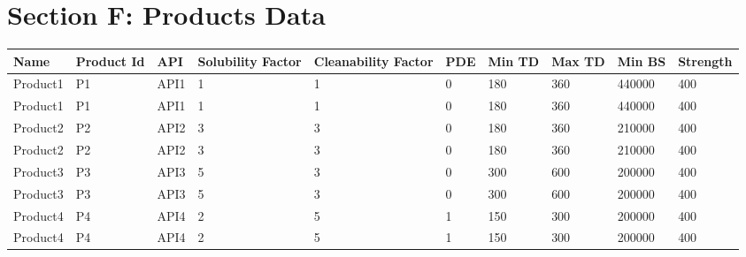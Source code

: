 \documentclass{article}
\begin{document}
        \section{Section F: Products Data}
        \begin{longtable}[l]{|p{1.5cm} |p{2cm} |p{1.5cm} |p{1.5cm} |p{2cm} |p{2cm} |p{2cm} |p{2cm} |p{2cm} |p{2cm} |}
        
Name&Product Id&API&Solubility Factor&Cleanability Factor&PDE&Min TD&Max TD&Min BS&Strength\\
\hline

Product1&P1&API1&1&1&0&180&360&440000&400\\
\hline

Product1&P1&API1&1&1&0&180&360&440000&400\\
\hline

Product2&P2&API2&3&3&0&180&360&210000&400\\
\hline

Product2&P2&API2&3&3&0&180&360&210000&400\\
\hline

Product3&P3&API3&5&3&0&300&600&200000&400\\
\hline

Product3&P3&API3&5&3&0&300&600&200000&400\\
\hline

Product4&P4&API4&2&5&1&150&300&200000&400\\
\hline

Product4&P4&API4&2&5&1&150&300&200000&400\\
\hline

        \end{longtable}
        
\end{document}
